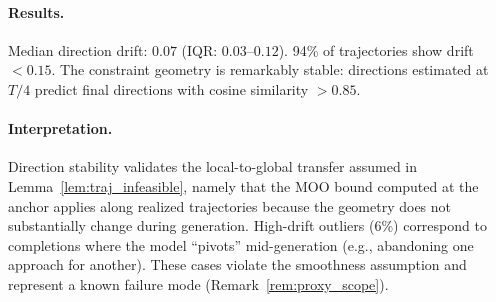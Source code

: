 \documentclass{article}
\theoremstyle{plain}
\theoremstyle{definition}
\theoremstyle{remark}
\begin{document}
\paragraph{Results.}
Median direction drift: $0.07$ (IQR: $0.03$--$0.12$). 94\% of trajectories show drift ${<}0.15$. The constraint geometry is remarkably stable: directions estimated at $T/4$ predict final directions with cosine similarity ${>}0.85$.

\paragraph{Interpretation.}
Direction stability validates the local-to-global transfer assumed in Lemma~\ref{lem:traj_infeasible}, namely that the MOO bound computed at the anchor applies along realized trajectories because the geometry does not substantially change during generation. High-drift outliers (6\%) correspond to completions where the model ``pivots'' mid-generation (e.g., abandoning one approach for another). These cases violate the smoothness assumption and represent a known failure mode (Remark~\ref{rem:proxy_scope}).
\end{document}

